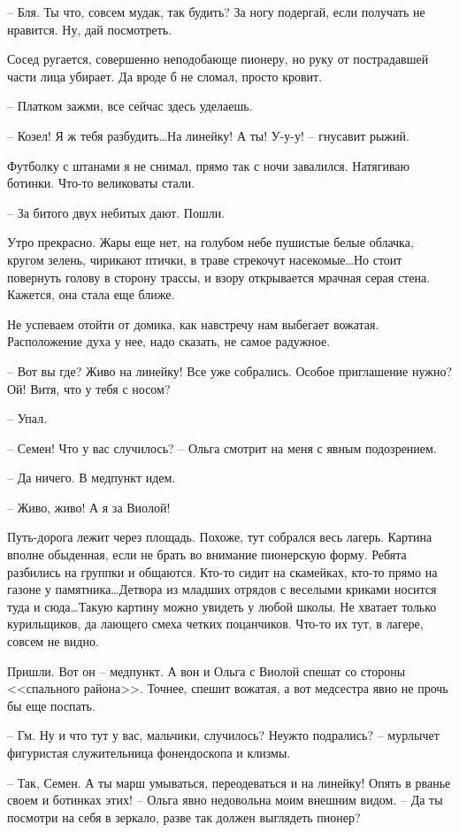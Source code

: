 \documentclass[a4paper]{book}
\begin{document}
-- Бля. Ты что, совсем мудак, так будить? За ногу подергай, если получать не нравится. Ну, дай посмотреть.

Сосед ругается, совершенно неподобающе пионеру, но руку от пострадавшей части лица убирает. Да вроде б не сломал, просто кровит. 

-- Платком зажми, все сейчас здесь уделаешь. 

-- Козел! Я ж тебя разбудить\ldots На линейку! А ты! У-у-у! -- гнусавит рыжий.

Футболку с штанами я не снимал, прямо так с ночи завалился. Натягиваю ботинки. Что-то великоваты стали. 

-- За битого двух небитых дают. Пошли.

Утро прекрасно. Жары еще нет, на голубом небе пушистые белые облачка, кругом зелень, чирикают птички, в траве стрекочут насекомые\ldots Но стоит повернуть голову в сторону трассы, и взору открывается мрачная серая стена. Кажется, она стала еще ближе.

Не успеваем отойти от домика, как навстречу нам выбегает вожатая. Расположение духа у нее, надо сказать, не самое радужное.

-- Вот вы где? Живо на линейку! Все уже собрались. Особое приглашение нужно? Ой! Витя, что у тебя с носом?

-- Упал. 

-- Семен! Что у вас случилось? -- Ольга смотрит на меня с явным подозрением.

-- Да ничего. В медпункт идем.

-- Живо, живо! А я за Виолой!

Путь-дорога лежит через площадь. Похоже, тут собрался весь лагерь. Картина вполне обыденная, если не брать во внимание пионерскую форму. Ребята разбились на группки и общаются. Кто-то сидит на скамейках, кто-то прямо на газоне у памятника\ldots Детвора из младших отрядов с веселыми криками носится туда и сюда\ldots Такую картину можно увидеть у любой школы. Не хватает только курильщиков, да лающего смеха четких поцанчиков. Что-то их тут, в лагере, совсем не видно.

Пришли. Вот он -- медпункт. А вон и Ольга с Виолой спешат со стороны <<спального района>>. Точнее, спешит вожатая, а вот медсестра явно не прочь бы еще поспать.

-- Гм. Ну и что тут у вас, мальчики, случилось? Неужто подрались? -- мурлычет фигуристая служительница фонендоскопа и клизмы.

-- Так, Семен. А ты марш умываться, переодеваться и на линейку! Опять в рванье своем и ботинках этих! -- Ольга явно недовольна моим внешним видом. -- Да ты посмотри на себя в зеркало, разве так должен выглядеть пионер?
\end{document}

